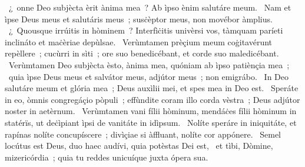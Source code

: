 { }
{%
~¿~onne Deo subjècta èrit ànima mea~? Ab ìpso ènim salutáre meum. 
~Nam et ìpse Deus meus et salutáris meus~; susċèptor meus, non movébor àmplius. 
~¿~Quousque irrúitis in hòminem~? Interfìċitis univèrsi vos, tàmquam paríeti inclináto et maċèriae depùlsae. 
~Verùmtamen prèçium meum coġitavérunt repèllere~; cucùrri in sìti~; ore suo benedicébant, et corde suo maledicébant. 
~Verùmtamen Deo subjècta èsto, ànima mea, quóniam ab ìpso patiènçia mea~; 
~quia ìpse Deus meus et salvátor meus, adjútor meus~; non emigrábo. 
~In Deo salutáre meum et glória mea~; Deus auxìlii mei, et spes mea in Deo est. 
~Speráte in eo, òmnis congregáçio pòpuli~; effùndite coram illo corda vèstra~; Deus adjútor noster in aetèrnum. 
~Verùmtamen vani fílii hòminum, mendáċes fílii hòminum in statérïs, ut deċìpiant ìpsi de vanitáte in idìpsum. 
~Nolíte speráre in iniquitáte, et rapínas nolíte concupíscere~; divìçiae si àffluant, nolíte cor appónere. 
~Semel locútus est Deus, duo haec audívi, quia potèstas Dei est, 
~et tìbi, Dòmine, mizericórdia~; quia tu reddes unicuíque juxta ópera sua. 
}
